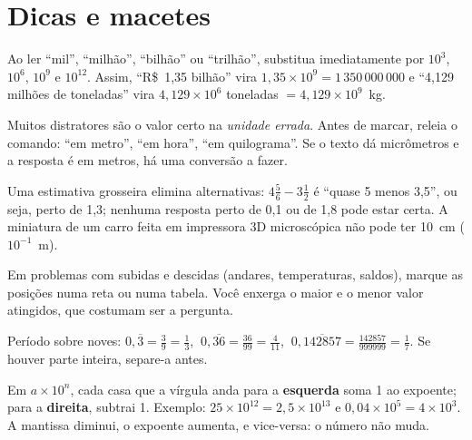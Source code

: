 \section{Dicas e macetes}

\begin{dica}
Ao ler ``mil'', ``milhão'', ``bilhão'' ou ``trilhão'', substitua imediatamente por $10^3$, $10^6$,
$10^9$ e $10^{12}$. Assim, ``R\$~1,35 bilhão'' vira $1,35\times 10^9=1\,350\,000\,000$ e
``4,129 milhões de toneladas'' vira $4,129\times 10^6$ toneladas $=4,129\times 10^{9}$~kg.
\end{dica}

\begin{dica}
Muitos distratores são o valor certo na \emph{unidade errada}. Antes de marcar, releia o comando:
``em metro'', ``em hora'', ``em quilograma''. Se o texto dá micrômetros e a resposta é em metros,
há uma conversão a fazer.
\end{dica}

\begin{dica}
Uma estimativa grosseira elimina alternativas: $4\frac{5}{6}-3\frac{1}{2}$ é ``quase 5 menos 3,5'',
ou seja, perto de 1,3; nenhuma resposta perto de 0,1 ou de 1,8 pode estar certa. A miniatura de um
carro feita em impressora 3D microscópica não pode ter 10~cm ($10^{-1}$~m).
\end{dica}

\begin{dica}
Em problemas com subidas e descidas (andares, temperaturas, saldos), marque as posições numa reta
ou numa tabela. Você enxerga o maior e o menor valor atingidos, que costumam ser a pergunta.
\end{dica}

\begin{macete}
Período sobre noves: $0,\overline{3}=\frac{3}{9}=\frac{1}{3}$, $\ 0,\overline{36}=\frac{36}{99}=\frac{4}{11}$,
$\ 0,\overline{142857}=\frac{142857}{999999}=\frac{1}{7}$. Se houver parte inteira, separe-a antes.
\end{macete}

\begin{macete}
Em $a\times 10^n$, cada casa que a vírgula anda para a \textbf{esquerda} soma 1 ao expoente; para a
\textbf{direita}, subtrai 1. Exemplo: $25\times 10^{12}=2,5\times 10^{13}$ e
$0,04\times 10^{5}=4\times 10^{3}$. A mantissa diminui, o expoente aumenta, e vice-versa: o número
não muda.
\end{macete}

